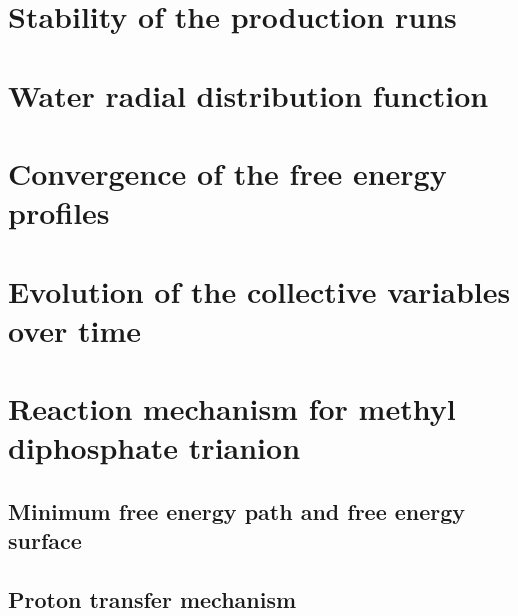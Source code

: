 
\section{Stability of the production runs}




\section{Water radial distribution function}




\section{Convergence of the free energy profiles}




\section{Evolution of the collective variables over time}





\section{Reaction mechanism for methyl diphosphate trianion}
\subsection{Minimum free energy path and free energy surface}
\subsection{Proton transfer mechanism}




